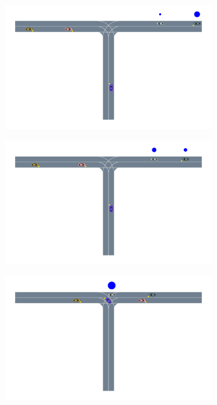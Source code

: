 \begin{figure}
    \centering
   \begin{subfigure}[t]{0.7\textwidth}
        \centering
        \includegraphics[width=\textwidth, trim={2cm 5cm 1cm 0},clip]{figures/problem_decomposition/f1_1.pdf}
    \end{subfigure}
    \begin{subfigure}[t]{0.7\textwidth}
        \centering
        \includegraphics[width=\textwidth, trim={2cm 5cm 1cm 0},clip]{figures/problem_decomposition/f1_4.pdf}
    \end{subfigure}
    \begin{subfigure}[t]{0.7\textwidth}
    \centering
    \includegraphics[width=\textwidth, trim={2cm 5cm 1cm 0},clip]{figures/problem_decomposition/f1_18.pdf}

\end{subfigure}
\end{figure}
